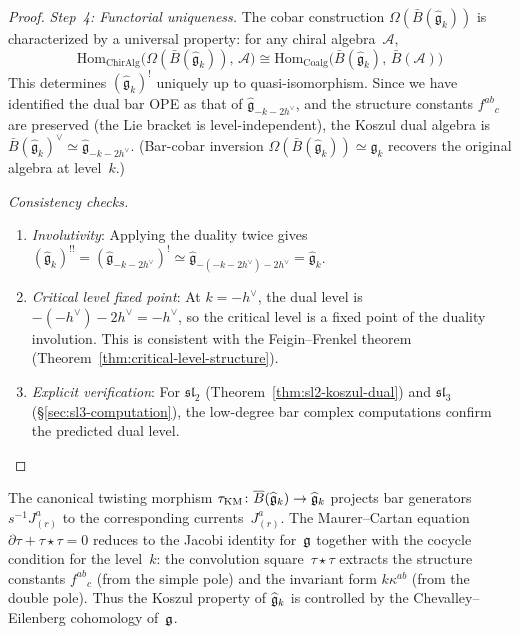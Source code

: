 \begin{proof}
\emph{Step~4: Functorial uniqueness.}
The cobar construction $\Omega(\bar{B}(\widehat{\mathfrak{g}}_k))$ is characterized by a universal property: for any chiral algebra~$\mathcal{A}$,
\begin{equation}
\mathrm{Hom}_{\text{ChirAlg}}\bigl(\Omega(\bar{B}(\widehat{\mathfrak{g}}_k)),\, \mathcal{A}\bigr) \cong \mathrm{Hom}_{\text{Coalg}}\bigl(\bar{B}(\widehat{\mathfrak{g}}_k),\, \bar{B}(\mathcal{A})\bigr)
\end{equation}
This determines $(\widehat{\mathfrak{g}}_k)^!$ uniquely up to quasi-isomorphism.  Since we have identified the dual bar OPE as that of $\widehat{\mathfrak{g}}_{-k-2h^\vee}$, and the structure constants $f^{ab}{}_c$ are preserved (the Lie bracket is level-independent), the Koszul dual algebra is $\bar{B}(\widehat{\mathfrak{g}}_k)^\vee \simeq \widehat{\mathfrak{g}}_{-k-2h^\vee}$.  (Bar-cobar inversion $\Omega(\bar{B}(\widehat{\mathfrak{g}}_k)) \simeq \widehat{\mathfrak{g}}_k$ recovers the original algebra at level~$k$.)

\emph{Consistency checks.}
\begin{enumerate}
\item \emph{Involutivity}: Applying the duality twice gives $(\widehat{\mathfrak{g}}_k)^{!!} = (\widehat{\mathfrak{g}}_{-k-2h^\vee})^! \simeq \widehat{\mathfrak{g}}_{-(-k-2h^\vee)-2h^\vee} = \widehat{\mathfrak{g}}_k$. \checkmark
\item \emph{Critical level fixed point}: At $k = -h^\vee$, the dual level is $-(-h^\vee) - 2h^\vee = -h^\vee$, so the critical level is a fixed point of the duality involution.  This is consistent with the Feigin--Frenkel theorem (Theorem~\ref{thm:critical-level-structure}). \checkmark
\item \emph{Explicit verification}: For $\mathfrak{sl}_2$ (Theorem~\ref{thm:sl2-koszul-dual}) and $\mathfrak{sl}_3$ (\S\ref{sec:sl3-computation}), the low-degree bar complex computations confirm the predicted dual level. \checkmark
\end{enumerate}
\end{proof}

\begin{remark}
\label{rem:km-twisting-morphism}
The canonical twisting morphism
$\tau_{\mathrm{KM}} \colon \overline{B}(\widehat{\mathfrak{g}}_k) \to \widehat{\mathfrak{g}}_k$
projects bar generators $s^{-1}J^a_{(r)}$ to the corresponding
currents~$J^a_{(r)}$.  The Maurer--Cartan equation
$\partial\tau + \tau \star \tau = 0$ reduces to the Jacobi identity
for~$\mathfrak{g}$ together with the cocycle condition for the level~$k$:
the convolution square~$\tau \star \tau$ extracts the structure
constants $f^{ab}{}_c$ (from the simple pole) and the invariant
form $k\kappa^{ab}$ (from the double pole).  Thus the Koszul
property of $\widehat{\mathfrak{g}}_k$ is controlled by the Chevalley--Eilenberg
cohomology of~$\mathfrak{g}$.
\end{remark}

